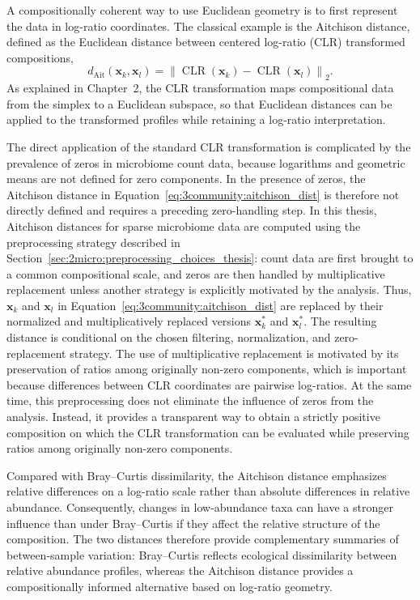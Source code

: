 A compositionally coherent way to use Euclidean geometry is to first represent the data in log-ratio coordinates. The classical example is the Aitchison distance, defined as the Euclidean distance between centered log-ratio (CLR) transformed compositions,
\begin{equation}
d_{\mathrm{Ait}}(\mathbf{x}_k,\mathbf{x}_l)=\left\|\operatorname{CLR}(\mathbf{x}_k)-\operatorname{CLR}(\mathbf{x}_l)\right\|_2.
\label{eq:3community:aitchison_dist}
\end{equation}
As explained in Chapter~2, the CLR transformation maps compositional data from the simplex to a Euclidean subspace, so that Euclidean distances can be applied to the transformed profiles while retaining a log-ratio interpretation.

The direct application of the standard CLR transformation is complicated by the prevalence of zeros in microbiome count data, because logarithms and geometric means are not defined for zero components. In the presence of zeros, the Aitchison distance in Equation~\eqref{eq:3community:aitchison_dist} is therefore not directly defined and requires a preceding zero-handling step. In this thesis, Aitchison distances for sparse microbiome data are computed using the preprocessing strategy described in Section~\ref{sec:2micro:preprocessing_choices_thesis}: count data are first brought to a common compositional scale, and zeros are then handled by multiplicative replacement unless another strategy is explicitly motivated by the analysis. Thus, $\mathbf{x}_k$ and $\mathbf{x}_l$ in Equation~\eqref{eq:3community:aitchison_dist} are replaced by their normalized and multiplicatively replaced versions $\mathbf{x}_k^\ast$ and $\mathbf{x}_l^\ast$. The resulting distance is conditional on the chosen filtering, normalization, and zero-replacement strategy. The use of multiplicative replacement is motivated by its preservation of ratios among originally non-zero components, which is important because differences between CLR coordinates are pairwise log-ratios. At the same time, this preprocessing does not eliminate the influence of zeros from the analysis. Instead, it provides a transparent way to obtain a strictly positive composition on which the CLR transformation can be evaluated while preserving ratios among originally non-zero components.

Compared with Bray--Curtis dissimilarity, the Aitchison distance emphasizes relative differences on a log-ratio scale rather than absolute differences in relative abundance. Consequently, changes in low-abundance taxa can have a stronger influence than under Bray--Curtis if they affect the relative structure of the composition. The two distances therefore provide complementary summaries of between-sample variation: Bray--Curtis reflects ecological dissimilarity between relative abundance profiles, whereas the Aitchison distance provides a compositionally informed alternative based on log-ratio geometry.

